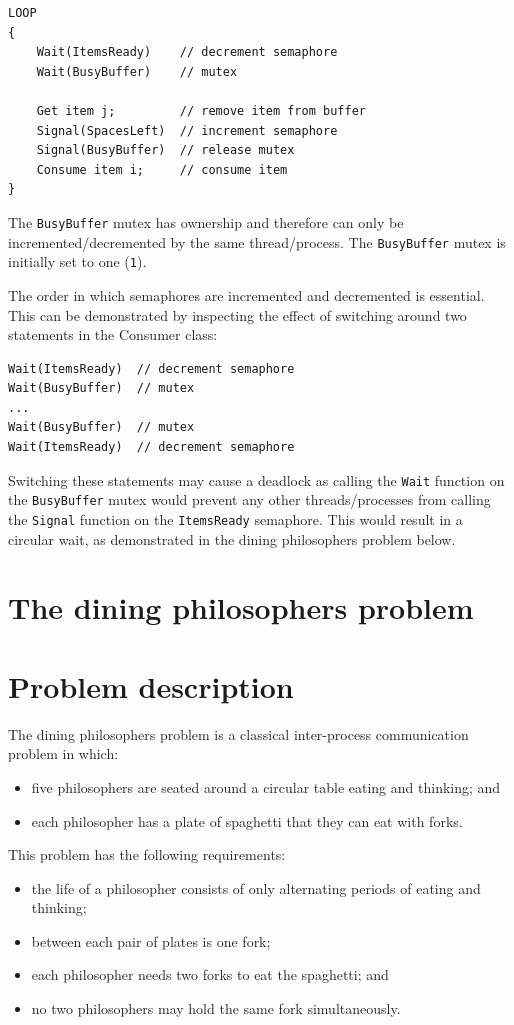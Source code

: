 \documentclass[a4paper]{systems-software}
\begin{document}
\begin{lstlisting}[title={Consumer class.}]
LOOP
{
	Wait(ItemsReady)    // decrement semaphore
    Wait(BusyBuffer)    // mutex

    Get item j;         // remove item from buffer
    Signal(SpacesLeft)  // increment semaphore
    Signal(BusyBuffer)  // release mutex
    Consume item i;     // consume item
}
\end{lstlisting}

The \texttt{BusyBuffer} mutex has ownership and therefore can only be incremented/decremented by the same thread/process. The \texttt{BusyBuffer} mutex is initially set to one (\texttt{1}).

The order in which semaphores are incremented and decremented is essential. This can be demonstrated by inspecting the effect of switching around two statements in the Consumer class:
\begin{lstlisting}
Wait(ItemsReady)  // decrement semaphore
Wait(BusyBuffer)  // mutex
...
Wait(BusyBuffer)  // mutex
Wait(ItemsReady)  // decrement semaphore
\end{lstlisting}

Switching these statements may cause a deadlock as calling the \texttt{Wait} function on the \texttt{BusyBuffer} mutex would prevent any other threads/processes from calling the \texttt{Signal} function on the \texttt{ItemsReady} semaphore. This would result in a circular wait, as demonstrated in the dining philosophers problem below.


\section{The dining philosophers problem}

\section*{Problem description}

The dining philosophers problem is a classical inter-process communication problem in which:
\begin{itemize}
	\item five philosophers are seated around a circular table eating and thinking; and
	\item each philosopher has a plate of spaghetti that they can eat with forks.
\end{itemize}

This problem has the following requirements:
\begin{itemize}
	\item the life of a philosopher consists of only alternating periods of eating and thinking;
	\item between each pair of plates is one fork;
	\item each philosopher needs two forks to eat the spaghetti; and
	\item no two philosophers may hold the same fork simultaneously.
\end{itemize}
\end{document}
